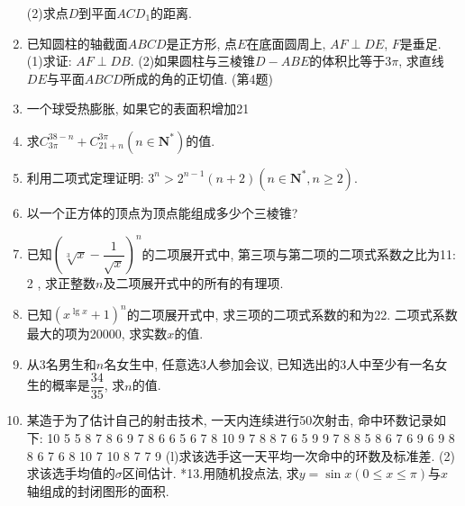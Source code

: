 \documentclass[10pt,a4paper]{article}
\begin{document}
\begin{enumerate}[1.]
(2)求点$D$到平面$ACD_1$的距离.
\item 已知圆柱的轴截面$ABCD$是正方形, 点$E$在底面圆周上, $AF\perp DE$, $F$是垂足.
(1)求证: $AF\perp DB$.
(2)如果圆柱与三棱锥$D-ABE$的体积比等于$3\pi$, 求直线$DE$与平面$ABCD$所成的角的正切值.
(第4题)
\item 一个球受热膨胀, 如果它的表面积增加21%
\item 求$C_{3\pi }^{38-n}+C_{21+n}^{3\pi }(n\in \mathbf{N}^*)$的值.
\item 利用二项式定理证明: $3^n>2^{n-1}(n+2)(n\in \mathbf{N}^*,n\ge 2)$.
\item 以一个正方体的顶点为顶点能组成多少个三棱锥?
\item 已知$(\sqrt[3]x-\dfrac 1{\sqrt x})^n$的二项展开式中, 第三项与第二项的二项式系数之比为11: 2 , 求正整数$n$及二项展开式中的所有的有理项.
\item 已知$(x^{\lg x}+1)^n$的二项展开式中, 求三项的二项式系数的和为22. 二项式系数最大的项为20000, 求实数$x$的值.
\item 从3名男生和$n$名女生中, 任意选3人参加会议, 已知选出的3人中至少有一名女生的概率是$\dfrac{34}{35}$, 求$n$的值.
\item 某造于为了估计自己的射击技术, 一天内连续进行50次射击, 命中环数记录如下:
10	5	5	8	7	8	6	9	7	8
6	6	5	6	7	8	10	9	7	8
8	7	6	5	9	9	7	8	8	5
8	6	7	6	9	6	9	8	8	6
7	6	8	10	7	10	8	7	7	9
(l)求该选手这一天平均一次命中的环数及标准差.
(2)求该选手均值的$\sigma$区间估计.
*13.用随机投点法, 求$y=\sin x(0\le x\le \pi)$与$x$轴组成的封闭图形的面积.
    


\end{enumerate}
\end{document}
